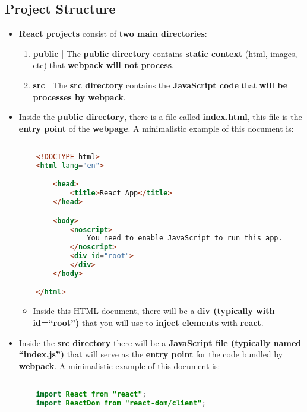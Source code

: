 \documentclass{article}
\begin{document}
    \subsection*{Project Structure}
    \begin{itemize}
        \item \textbf{React projects} consist of \textbf{two main directories}:
        \begin{enumerate}
            \item \textbf{public} | The \textbf{public directory} contains \textbf{static context} (html, images, etc) that \textbf{webpack will not process}.
            \item \textbf{src} | The \textbf{src directory} contains the \textbf{JavaScript code} that \textbf{will be processes by webpack}.
        \end{enumerate}
        \item Inside the \textbf{public directory}, there is a file called \textbf{index.html}, this file is the \textbf{entry point} of the \textbf{webpage}. A minimalistic example of this document is:
        \begin{lstlisting}[language=HTML]

    <!DOCTYPE html>
    <html lang="en">

        <head>
            <title>React App</title>
        </head>

        <body>
            <noscript>
                You need to enable JavaScript to run this app.
            </noscript>
            <div id="root">
            </div>
        </body>

    </html>
        \end{lstlisting}
        \begin{itemize}
            \item Inside this HTML document, there will be a \textbf{div (typically with id=``root'')} that you will use to \textbf{inject elements} with \textbf{react}.
        \end{itemize}
        \item Inside the \textbf{src directory} there will be a \textbf{JavaScript file (typically named ``index.js'')} that will serve as the \textbf{entry point} for the code bundled by \textbf{webpack}. A minimalistic example of this document is:
        \begin{lstlisting}[language=Java]

    import React from "react";
    import ReactDom from "react-dom/client";


\end{lstlisting}
\end{itemize}
\end{document}

